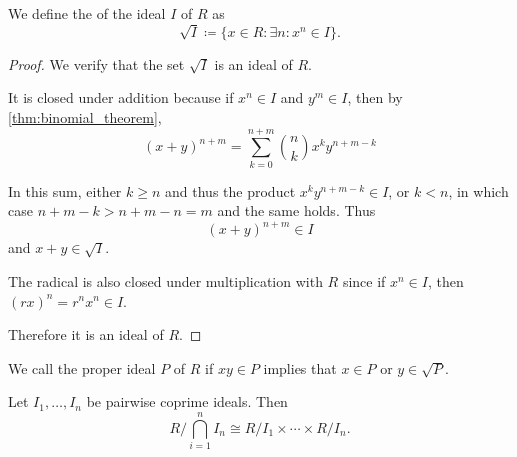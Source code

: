 \begin{definition}\label{def:radical_ideal}\cite[15]{Kocev2016}
  We define the  of the ideal \( I \) of \( R \) as
  \begin{equation*}
    \sqrt I \coloneqq \{ x \in R \colon \exists n: x^n \in I \}.
  \end{equation*}
\end{definition}
\begin{proof}
  We verify that the set \( \sqrt I \) is an ideal of \( R \).

  It is closed under addition because if \( x^n \in I \) and \( y^m \in I \), then by \cref{thm:binomial_theorem},
  \begin{equation*}
    (x + y)^{n+m}
    =
    \sum_{k=0}^{n+m} \binom n k x^k y^{n+m-k}
  \end{equation*}

  In this sum, either \( k \geq n \) and thus the product \( x^k y^{n+m-k} \in I \), or \( k < n \), in which case \( n + m - k > n + m - n = m \) and the same holds. Thus
  \begin{equation*}
    (x + y)^{n+m} \in I
  \end{equation*}
  and \( x + y \in \sqrt I \).

  The radical is also closed under multiplication with \( R \) since if \( x^n \in I \), then \( (rx)^n = r^n x^n \in I \).

  Therefore it is an ideal of \( R \).
\end{proof}

\begin{definition}\label{def:primary_ring_ideal}\cite[74]{Kocev2016}
  We call the proper ideal \( P \) of \( R \)  if \( xy \in P \) implies that \( x \in P \) or \( y \in \sqrt P \).
\end{definition}

\begin{theorem}\label{thm:chinese_remained_theorem}\cite[theorem 8.27]{Knapp2016BAlg}
  Let \( I_1, \ldots, I_n \) be pairwise coprime ideals. Then
  \begin{equation*}
    R / \bigcap_{i=1}^n I_n \cong R / I_1 \times \cdots \times R / I_n.
  \end{equation*}
\end{theorem}
